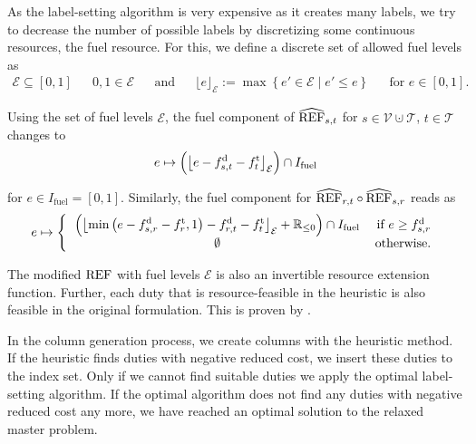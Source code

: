 As the label-setting algorithm is very expensive as it creates many labels, we try to decrease the number of possible labels by discretizing some continuous resources, \eg the fuel resource. For this, we define a discrete set of allowed fuel levels as
\begin{align*}
	\mathcal{E}\subseteq[0,1] && 0,1\in\mathcal{E} && \text{and} && \lfloor e\rfloor_{\mathcal{E}} := \max\left\{e'\in\mathcal{E}\mid e'\leq e\right\} && \text{for } e\in[0,1].
\end{align*}

Using the set of fuel levels $\mathcal{E}$, the fuel component of $\widehat{\operatorname{REF}}_{s,t}$ for ${s\in\mathcal{V}\cupdot\mathcal{T}}$, ${t\in\mathcal{T}}$ changes to
\begin{align*}
	e\mapsto \left(\left\lfloor e - f^{\operatorname{d}}_{s,t} - f^{\operatorname{t}}_t\right\rfloor_{\mathcal{E}}\right)\cap I_{\operatorname{fuel}}
\end{align*}

for $e\in I_{\operatorname{fuel}} = [0,1]$. Similarly, the fuel component for ${\widehat{\operatorname{REF}}_{r,t}\circ\widehat{\operatorname{REF}}_{s,r}}$ reads as
\begin{align*}
	e\mapsto \left\{\begin{tabular}{cr}
		$\displaystyle{\left(\left\lfloor\min\left(e - \fd_{s,r} - \ft_r, 1\right) - \fd_{r,t} - \ft_t\right\rfloor_{\mathcal{E}} + \mathbb{R}_{\leq 0}\right)\cap I_{\operatorname{fuel}}}$ & if $e\geq \fd_{s,r}$ \\
		$\emptyset$ & otherwise.
	\end{tabular}\right.
\end{align*}

The modified $\operatorname{REF}$ with fuel levels $\mathcal{E}$ is also an invertible resource extension function. Further, each duty that is resource-feasible in the heuristic is also feasible in the original formulation. This is proven by \cite{Kaiser}.

In the column generation process, we create columns with the heuristic method. If the heuristic finds duties with negative reduced cost, we insert these duties to the index set. Only if we cannot find suitable duties we apply the optimal label-setting algorithm. If the optimal algorithm does not find any duties with negative reduced cost any more, we have reached an optimal solution to the relaxed master problem.


